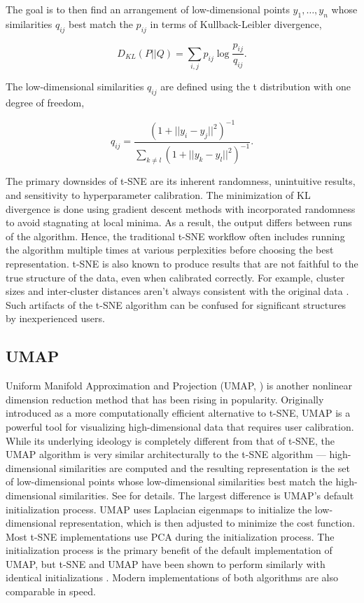 \documentclass{article}
\begin{document}
The goal is to then find an arrangement of low-dimensional points $y_1, \hdots, y_n$ whose similarities $q_{ij}$ best match the $p_{ij}$ in terms of Kullback-Leibler divergence, \begin{linenomath}$$D_{KL}(P || Q) = \sum_{i,j} p_{ij} \log \frac{p_{ij}}{q_{ij}}.$$\end{linenomath} The low-dimensional similarities $q_{ij}$ are defined using the t distribution with one degree of freedom, \begin{linenomath}$$q_{ij} = \frac{(1 + ||y_i - y_j||^2)^{-1}}{ \sum_{k \neq l} (1 + ||y_k - y_l||^2)^{-1}}.$$\end{linenomath}

The primary downsides of t-SNE are its inherent randomness, unintuitive results, and sensitivity to hyperparameter calibration. The minimization of KL divergence is done using gradient descent methods with incorporated randomness to avoid stagnating at local minima. As a result, the output differs between runs of the algorithm. Hence, the traditional t-SNE workflow often includes running the algorithm multiple times at various perplexities before choosing the best representation. t-SNE is also known to produce results that are not faithful to the true structure of the data, even when calibrated correctly. For example, cluster sizes and inter-cluster distances aren't always consistent with the original data \cite{Distill}. Such artifacts of the t-SNE algorithm can be confused for significant structures by inexperienced users.

\subsection{UMAP}
Uniform Manifold Approximation and Projection (UMAP, \cite{umap}) is another nonlinear dimension reduction method that has been rising in popularity. Originally introduced as a more computationally efficient alternative to t-SNE, UMAP is a powerful tool for visualizing high-dimensional data that requires user calibration. While its underlying ideology is completely different from that of t-SNE, the UMAP algorithm is very similar architecturally to the t-SNE algorithm --- high-dimensional similarities are computed and the resulting representation is the set of low-dimensional points whose low-dimensional similarities best match the high-dimensional similarities. See \cite{umap} for details. The largest difference is UMAP's default initialization process. UMAP uses Laplacian eigenmaps to initialize the low-dimensional representation, which is then adjusted to minimize the cost function. Most t-SNE implementations use PCA during the initialization process. The initialization process is the primary benefit of the default implementation of UMAP, but t-SNE and UMAP have been shown to perform similarly with identical initializations \cite{t-SNE/UMAP example}. Modern implementations of both algorithms are also comparable in speed.
\end{document}

